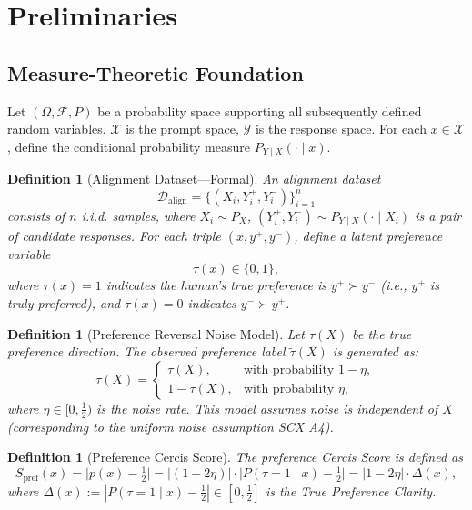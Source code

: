 \documentclass[12pt,a4paper]{article}
\newtheorem{definition}[theorem]{Definition}
\newcommand{\cX}{\mathcal{X}}
\newcommand{\cY}{\mathcal{Y}}
\newcommand{\cD}{\mathcal{D}}
\begin{document}
\section{Preliminaries}

\subsection{Measure-Theoretic Foundation}

Let $(\Omega, \mathcal{F}, P)$ be a probability space supporting all subsequently defined random variables.
$\cX$ is the prompt space, $\cY$ is the response space.
For each $x\in\cX$, define the conditional probability measure $P_{Y\mid X}(\cdot\mid x)$.

\begin{definition}[Alignment Dataset---Formal]
\label{def:align-data-formal}
An alignment dataset
\[
\cD_{\mathrm{align}} = \{(X_i, Y_i^+, Y_i^-)\}_{i=1}^n
\]
consists of $n$ i.i.d. samples, where $X_i \sim P_X$, $(Y_i^+,Y_i^-)\sim P_{Y\mid X}(\cdot\mid X_i)$
is a pair of candidate responses. For each triple $(x,y^+,y^-)$, define a latent preference variable
\[
\tau(x) \in \{0,1\},
\]
where $\tau(x)=1$ indicates the human's true preference is $y^+ \succ y^-$ (i.e., $y^+$ is truly preferred),
and $\tau(x)=0$ indicates $y^- \succ y^+$.
\end{definition}

\begin{definition}[Preference Reversal Noise Model]
\label{def:pref-noise-formal}
Let $\tau(X)$ be the true preference direction. The observed preference label $\tilde{\tau}(X)$ is generated as:
\[
\tilde{\tau}(X) =
\begin{cases}
\tau(X), & \text{with probability } 1-\eta,\\
1-\tau(X), & \text{with probability } \eta,
\end{cases}
\]
where $\eta\in[0,\frac12)$ is the noise rate. This model assumes noise is independent of $X$ (corresponding to the uniform noise assumption SCX A4).
\end{definition}

\begin{definition}[Preference Cercis Score]
\label{def:S-pref-formal}
The preference Cercis Score is defined as
\[
S_{\mathrm{pref}}(x) = \bigl|p(x) - \tfrac12\bigr|
= \bigl|(1-2\eta)\bigr|\cdot\bigl|P(\tau=1\mid x) - \tfrac12\bigr|
= |1-2\eta|\cdot \Delta(x),
\]
where $\Delta(x) := |P(\tau=1\mid x) - \frac12| \in [0,\frac12]$ is the True Preference Clarity.
\end{definition}
\end{document}
